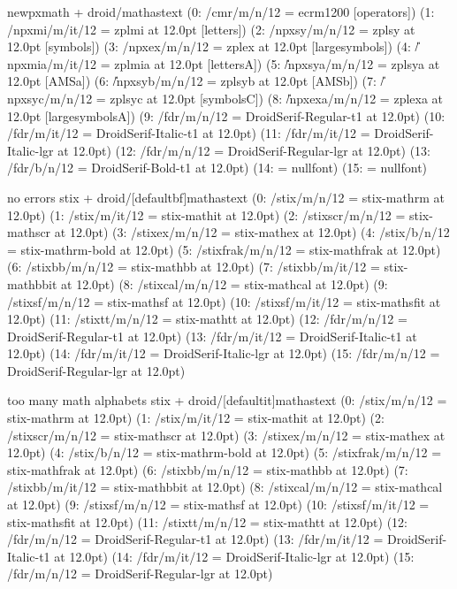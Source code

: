 \documentclass[12pt]{article}
\begin{document}
newpxmath + droid/mathastext
(0: /cmr/m/n/12 = ecrm1200 [operators])
(1: \OML/npxmi/m/it/12 = zplmi at 12.0pt [letters])
(2: \OMS/npxsy/m/n/12 = zplsy at 12.0pt [symbols])
(3: \OMX/npxex/m/n/12 = zplex at 12.0pt [largesymbols])
(4: \U/npxmia/m/it/12 = zplmia at 12.0pt [lettersA])
(5: \U/npxsya/m/n/12 = zplsya at 12.0pt [AMSa])
(6: \U/npxsyb/m/n/12 = zplsyb at 12.0pt [AMSb])
(7: \U/npxsyc/m/n/12 = zplsyc at 12.0pt [symbolsC])
(8: \U/npxexa/m/n/12 = zplexa at 12.0pt [largesymbolsA])
(9: /fdr/m/n/12 = DroidSerif-Regular-t1 at 12.0pt)
(10: /fdr/m/it/12 = DroidSerif-Italic-t1 at 12.0pt)
(11: \LGR/fdr/m/it/12 = DroidSerif-Italic-lgr at 12.0pt)
(12: \LGR/fdr/m/n/12 = DroidSerif-Regular-lgr at 12.0pt)
(13: /fdr/b/n/12 = DroidSerif-Bold-t1 at 12.0pt)
(14: \nullfont = nullfont)
(15: \nullfont = nullfont)

no errors
stix + droid/[defaultbf]mathastext
(0: /stix/m/n/12 = stix-mathrm at 12.0pt)
(1: /stix/m/it/12 = stix-mathit at 12.0pt)
(2: /stixscr/m/n/12 = stix-mathscr at 12.0pt)
(3: /stixex/m/n/12 = stix-mathex at 12.0pt)
(4: /stix/b/n/12 = stix-mathrm-bold at 12.0pt)
(5: /stixfrak/m/n/12 = stix-mathfrak at 12.0pt)
(6: /stixbb/m/n/12 = stix-mathbb at 12.0pt)
(7: /stixbb/m/it/12 = stix-mathbbit at 12.0pt)
(8: /stixcal/m/n/12 = stix-mathcal at 12.0pt)
(9: /stixsf/m/n/12 = stix-mathsf at 12.0pt)
(10: /stixsf/m/it/12 = stix-mathsfit at 12.0pt)
(11: /stixtt/m/n/12 = stix-mathtt at 12.0pt)
(12: /fdr/m/n/12 = DroidSerif-Regular-t1 at 12.0pt)
(13: /fdr/m/it/12 = DroidSerif-Italic-t1 at 12.0pt)
(14: \LGR/fdr/m/it/12 = DroidSerif-Italic-lgr at 12.0pt)
(15: \LGR/fdr/m/n/12 = DroidSerif-Regular-lgr at 12.0pt)

too many math alphabets
stix + droid/[defaultit]mathastext
(0: /stix/m/n/12 = stix-mathrm at 12.0pt)
(1: /stix/m/it/12 = stix-mathit at 12.0pt)
(2: /stixscr/m/n/12 = stix-mathscr at 12.0pt)
(3: /stixex/m/n/12 = stix-mathex at 12.0pt)
(4: /stix/b/n/12 = stix-mathrm-bold at 12.0pt)
(5: /stixfrak/m/n/12 = stix-mathfrak at 12.0pt)
(6: /stixbb/m/n/12 = stix-mathbb at 12.0pt)
(7: /stixbb/m/it/12 = stix-mathbbit at 12.0pt)
(8: /stixcal/m/n/12 = stix-mathcal at 12.0pt)
(9: /stixsf/m/n/12 = stix-mathsf at 12.0pt)
(10: /stixsf/m/it/12 = stix-mathsfit at 12.0pt)
(11: /stixtt/m/n/12 = stix-mathtt at 12.0pt)
(12: /fdr/m/n/12 = DroidSerif-Regular-t1 at 12.0pt)
(13: /fdr/m/it/12 = DroidSerif-Italic-t1 at 12.0pt)
(14: \LGR/fdr/m/it/12 = DroidSerif-Italic-lgr at 12.0pt)
(15: \LGR/fdr/m/n/12 = DroidSerif-Regular-lgr at 12.0pt)
\end{document}

